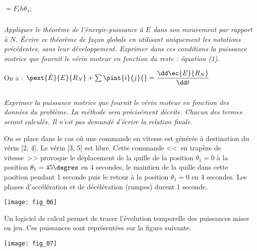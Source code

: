 \begin{multicols}{2}
\begin{corrige}
\begin{itemize}
$=F_t h \dot{\theta}_1$;

\end{itemize}
\end{corrige}
\else
\fi

\subparagraph{}\textit{Appliquer le théorème de l’énergie-puissance à $E$ dans son mouvement par rapport à $N$. Écrire ce
théorème de façon globale en utilisant uniquement les notations précédentes, sans leur
développement. Exprimer dans ces conditions la puissance motrice que fournit le vérin moteur en
fonction du reste : équation (1).}
\ifprof
\begin{corrige}
On a :
$\pext{\bar{E}}{E}{R_N} + \sum \pint{i}{j}{}=\dfrac{\dd \ec{E}{R_N}}{\dd t}$
\end{corrige}
\else
\fi

\else
\fi


\iftdifficile

\subparagraph{}\textit{ Exprimer la puissance motrice que fournit le vérin moteur en
fonction des données du problème. La méthode sera précisément décrite. Chacun des termes seront calculés. Il n'est pas demandé d'écrire la relation finale.}
\else
\fi

\ifprof
\else


On se place dans le cas où une commande en vitesse est générée à destination du vérin [2, 4]. Le vérin [3, 5]
est libre. Cette commande <<~en trapèze de vitesse~>>  provoque le déplacement de la quille de la position $\theta_1=0$
 à la position $\theta_1 = 45\degres$ en 4 secondes, le maintien de la quille dans cette position pendant 1 seconde puis le
 retour à la position $\theta_1=0$ en 4 secondes. Les phases d’accélération et de décélération (rampes) durent 1 seconde.


\begin{center}
\texttt{[image: fig\_06]}
\end{center}

Un logiciel de calcul permet de tracer l’évolution temporelle des puissances mises en jeu. Ces puissances sont
représentées sur la figure suivante. 

\begin{center}
\texttt{[image: fig\_07]}
\end{center}

\fi


\end{multicols}
